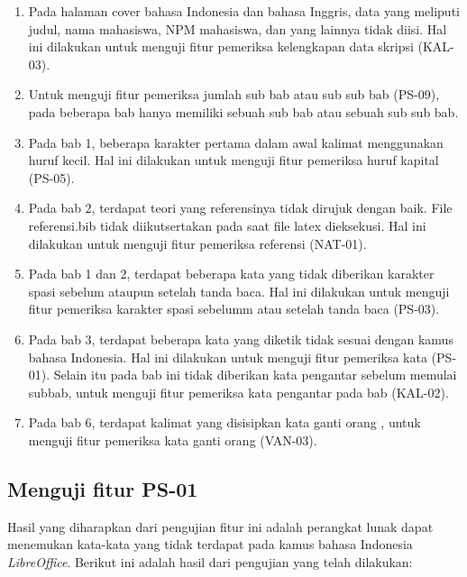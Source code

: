 \begin{enumerate}
	\item Pada halaman cover bahasa Indonesia dan bahasa Inggris, data yang meliputi judul, nama mahasiswa, NPM mahasiswa, dan yang lainnya tidak diisi. Hal ini dilakukan untuk menguji fitur pemeriksa kelengkapan data skripsi (KAL-03).
	
	\item Untuk menguji fitur pemeriksa jumlah sub bab atau sub sub bab (PS-09), pada beberapa bab hanya memiliki sebuah sub bab atau sebuah sub sub bab.
	
	\item Pada bab 1, beberapa karakter pertama dalam awal kalimat menggunakan huruf kecil. Hal ini dilakukan untuk menguji fitur pemeriksa huruf kapital (PS-05).
	
	\item Pada bab 2, terdapat teori yang referensinya tidak dirujuk dengan baik. File referensi.bib tidak diikutsertakan pada saat file latex dieksekusi. Hal ini dilakukan untuk menguji fitur pemeriksa referensi (NAT-01).
	
	\item Pada bab 1 dan 2, terdapat beberapa kata yang tidak diberikan karakter spasi sebelum ataupun setelah tanda baca. Hal ini dilakukan untuk menguji fitur pemeriksa karakter spasi sebelumm atau setelah tanda baca (PS-03).	

	\item Pada bab 3, terdapat beberapa kata yang diketik tidak sesuai dengan kamus bahasa Indonesia. Hal ini dilakukan untuk menguji fitur pemeriksa kata (PS-01). Selain itu pada bab ini tidak diberikan kata pengantar sebelum memulai subbab, untuk menguji fitur pemeriksa kata pengantar pada bab (KAL-02).
		
	\item Pada bab 6, terdapat kalimat yang disisipkan kata ganti orang , untuk menguji fitur pemeriksa kata ganti orang (VAN-03).
\end{enumerate}

\subsection{Menguji fitur PS-01}
Hasil yang diharapkan dari pengujian fitur ini adalah perangkat lunak dapat menemukan kata-kata yang tidak terdapat pada kamus bahasa Indonesia \textit{LibreOffice}. Berikut ini adalah hasil dari pengujian yang telah dilakukan:

